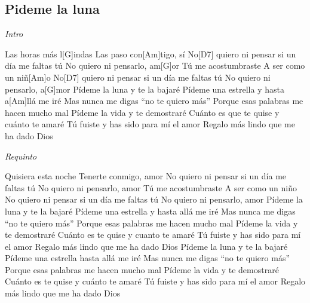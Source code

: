 \subsection{Pideme la luna}
\noindent

\vspace{1cm}

\begin{guitar}
	\begin{multicols}{2}
		\textit{Intro}
		\par
		Las horas más l[G]indas
		Las paso con[Am]tigo, sí
		No[D7] quiero ni pensar si un día me faltas tú
		No quiero ni pensarlo, am[G]or
		Tú me acostumbraste
		A ser como un niñ[Am]o
		No[D7] quiero ni pensar si un día me faltas tú
		No quiero ni pensarlo, a[G]mor
		Pídeme la luna y te la bajaré
		Pídeme una estrella y hasta a[Am]llá me iré
		Mas nunca me digas ``no te quiero más''
		Porque esas palabras me hacen mucho mal
		Pídeme la vida y te demostraré
		Cuánto es que te quise y cuánto te amaré
		Tú fuiste y has sido para mí el amor
		Regalo más lindo que me ha dado Dios

		\par
		\textit{Requinto}
		\par
		
		Quisiera esta noche
		Tenerte conmigo, amor
		No quiero ni pensar si un día me faltas tú
		No quiero ni pensarlo, amor
		Tú me acostumbraste
		A ser como un niño
		No quiero ni pensar si un día me faltas tú
		No quiero ni pensarlo, amor
		Pídeme la luna y te la bajaré
		Pídeme una estrella y hasta allá me iré
		Mas nunca me digas ``no te quiero más''
		Porque esas palabras me hacen mucho mal
		Pídeme la vida y te demostraré
		Cuánto es te quise y cuanto te amaré
		Tú fuiste y has sido para mí el amor
		Regalo más lindo que me ha dado Dios
		Pídeme la luna y te la bajaré
		Pídeme una estrella hasta allá me iré
		Mas nunca me digas ``no te quiero más''
		Porque esas palabras me hacen mucho mal
		Pídeme la vida y te demostraré
		Cuánto es te quise y cuánto te amaré
		Tú fuiste y has sido para mí el amor
		Regalo más lindo que me ha dado Dios

	\end{multicols}
\end{guitar}
